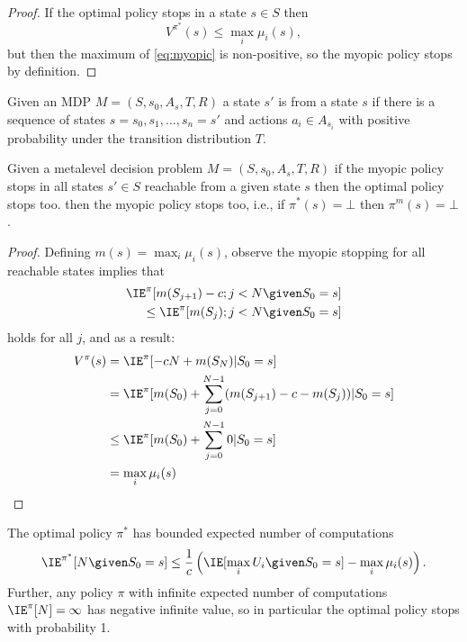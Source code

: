 \begin{proof}
	If the optimal policy stops in a state $s\in S$ then
	\[
		V^{\pi^*}(s) \le \max_i \mu_i(s),
	\]
	but then the maximum of \eqref{eq:myopic} is non-positive, so the 
	myopic policy stops by definition.
\end{proof}

\begin{dfn}
	Given an MDP $M=(S,s_0,A_s,T,R)$ a state $s'$ is  from a state $s$
	if there is a sequence of states $s=s_0,s_1,\dots,s_n=s'$ and actions $a_i\in A_{s_i}$
	with positive probability under the transition distribution $T$.
\end{dfn}


\begin{thm}\label{thm:myopic-optimal}
	Given a metalevel decision problem $M=(S,s_0,A_s,T,R)$
	if the myopic policy stops in all states $s'\in S$ reachable
	from a given state $s$ then the optimal policy stops too.
	then the myopic policy stops too, i.e., if $\pi^*(s)=\bot$ then $\pi^m(s)=\bot$.
\end{thm}

\begin{proof}
Defining $m(s) = \max_i\mu_i(s)$, observe the myopic stopping for all
reachable states implies that
\begin{align*}
	\IE^{\pi}[m(S_{j+1}) - c; j<N\given S_0=s] \\
	\le \IE^{\pi}[m(S_{j}); j<N\given S_0=s]
\end{align*}
holds for all $j$, and as a result:
\begin{align*}
	V^\pi(s) 
	&= \IE^{\pi}[ - c N + m(S_N) |S_0=s] \\
	&= \IE^{\pi}[m(S_0) + \sum_{j=0}^{N-1} (m(S_{j+1}) - c - m(S_j)) |S_0=s] \\	
	&\le \IE^{\pi}[m(S_0) + \sum_{j=0}^{N-1} 0 |S_0=s] \\		
	&= \max_i\mu_i(s)
\end{align*}
\end{proof}




\begin{thm}\label{thm:bounded-expected-computations}
	The optimal policy $\pi^*$ has bounded expected number of computations
	\[
		\IE^{\pi^*}[N\given S_0=s] \le \frac{1}{c} \left(\IE[\max_i U_i\given S_0=s] - \max_i \mu_i(s)\right).
	\]
	Further, any policy $\pi$ with infinite expected number of computations 
	$\IE^\pi[N]=\infty$ has negative infinite value, so in particular the optimal
	policy stops with probability 1.
\end{thm}

